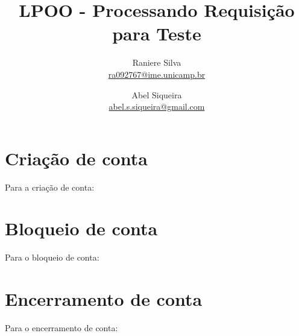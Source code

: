 \documentclass[A4paper]{article}
\title{LPOO - Processando Requisição para Teste}
\author{Raniere Silva \\ \url{ra092767@ime.unicamp.br} \and
        Abel Siqueira \\ \url{abel.s.siqueira@gmail.com}}
\begin{document}
\maketitle


\section{Criação de conta}
Para a criação de conta:

\section{Bloqueio de conta}
Para o bloqueio de conta:

\section{Encerramento de conta}
Para o encerramento de conta:
\end{document}
